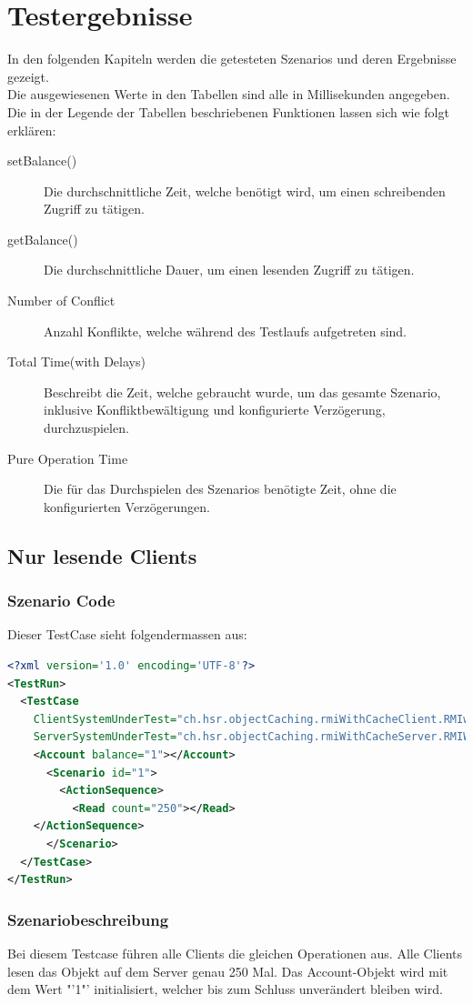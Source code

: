 \section{Testergebnisse}
In den folgenden Kapiteln werden die getesteten Szenarios und deren Ergebnisse gezeigt. \\
Die ausgewiesenen Werte in den Tabellen sind alle in Millisekunden angegeben. Die in der Legende der Tabellen beschriebenen Funktionen lassen sich wie folgt erklären:
\begin{description}
\item[setBalance()] Die durchschnittliche Zeit, welche benötigt wird, um einen schreibenden Zugriff zu tätigen.
\item[getBalance()] Die durchschnittliche Dauer, um einen lesenden Zugriff zu tätigen.
\item[Number of Conflict] Anzahl Konflikte, welche während des Testlaufs aufgetreten sind.
\item[Total Time(with Delays)] Beschreibt die Zeit, welche gebraucht wurde, um das gesamte Szenario, inklusive Konfliktbewältigung und konfigurierte Verzögerung, durchzuspielen.
\item[Pure Operation Time] Die für das Durchspielen des Szenarios benötigte Zeit, ohne die konfigurierten Verzögerungen.
\end{description}


\subsection{Nur lesende Clients}
\subsubsection{Szenario Code}
Dieser TestCase sieht folgendermassen aus:
\begin{lstlisting}[language=XML, breaklines=true]
<?xml version='1.0' encoding='UTF-8'?>
<TestRun>
  <TestCase
    ClientSystemUnderTest="ch.hsr.objectCaching.rmiWithCacheClient.RMIwithCacheClientSystem"
    ServerSystemUnderTest="ch.hsr.objectCaching.rmiWithCacheServer.RMIWithCacheServerSystem">
    <Account balance="1"></Account>
      <Scenario id="1">
        <ActionSequence>
          <Read count="250"></Read>
	</ActionSequence>
      </Scenario>
  </TestCase>
</TestRun>
\end{lstlisting}

\subsubsection{Szenariobeschreibung}
Bei diesem Testcase führen alle Clients die gleichen Operationen aus. Alle Clients lesen das Objekt auf dem Server genau 250 Mal. Das Account-Objekt wird mit dem Wert "'1"' initialisiert, welcher bis zum Schluss unverändert bleiben wird. 


